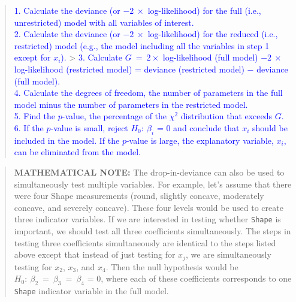 \documentclass[
]{report}
\begin{document}
\begin{quote}
\textcolor{blue}{1. Calculate the deviance (or $\scriptstyle -2 \ \times$ log-likelihood) for the full (i.e., unrestricted) model with all variables of interest.}\\
\textcolor{blue}{2. Calculate the deviance (or $\scriptstyle -2 \ \times$ log-likelihood) for the reduced (i.e., restricted) model (e.g., the model including all the variables in step 1 except for $\scriptstyle x_i$).} \textgreater{} \textcolor{blue}{3. Calculate $\scriptstyle G \ =\  2 \times$ log-likelihood (full model) $\scriptstyle -2 \ \times$ log-likelihood (restricted model) = deviance (restricted model) $-$ deviance (full model).}\\
\textcolor{blue}{4. Calculate the degrees of freedom, the number of parameters in the full model minus the number of parameters in the restricted model.}\\
\textcolor{blue}{5. Find the $\scriptstyle p$-value, the percentage of the $\scriptstyle \chi^2$ distribution that exceeds $\scriptstyle G$.}\\
\textcolor{blue}{6. If the $\scriptstyle p$-value is small, reject $\scriptstyle H_0: \ \beta_i$ = 0 and conclude that $\scriptstyle x_i$ should be included in the model. If the $\scriptstyle p$-value is large, the explanatory variable, $\scriptstyle x_i$, can be eliminated from the model.}
\end{quote}

\endgroup

\begin{quote}
\textbf{MATHEMATICAL NOTE:}
The drop-in-deviance can also be used to simultaneously test multiple variables. For example, let's assume that there were four Shape measurements (round, slightly concave, moderately concave, and severely concave). These four levels would be used to create three indicator variables. If we are interested in testing whether \texttt{Shape} is important, we should test all three coefficients simultaneously. The steps in testing three coefficients simultaneously are identical to the steps listed above except that instead of just testing for \(\scriptstyle x_j\), we are simultaneously testing for \(\scriptstyle x_2\), \(\scriptstyle x_3\), and \(\scriptstyle x_4\). Then the null hypothesis would be \(\scriptstyle H_0: \ \beta_2 \ =\  \beta_3 \ =\  \beta_4\) = 0, where each of these coefficients corresponds to one \texttt{Shape} indicator variable in the full model.
\end{quote}
\end{document}
